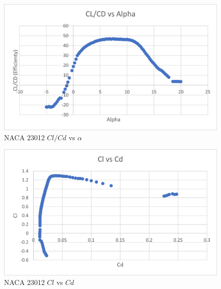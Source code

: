 \documentclass{article}
\begin{document}
\begin{figure}[!h]
\begin{center}
	\includegraphics[scale=0.7]{NACA 23012 Efficiencyalpha.png}
	\caption{NACA 23012 $Cl/Cd$ vs $\alpha$}
	\label{Figure2:}
\end{center}
\end{figure}

\begin{figure}[!h]
\begin{center}
	\includegraphics[scale=0.7]{NACA 23012 ClCd.png}
	\caption{NACA 23012 $Cl$ vs $Cd$}
	\label{Figure3:}
\end{center}
\end{figure}

\newpage
\end{document}
